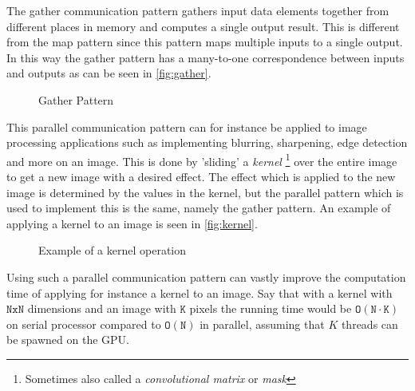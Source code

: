 The gather communication pattern gathers input data elements together from different places in memory and computes a single output result.
This is different from the map pattern since this pattern maps multiple inputs to a single output.
In this way the gather pattern has a many-to-one correspondence between inputs and outputs as can be seen in \autoref{fig:gather}.

\begin{figure}[ht]
	\centering
	\caption{Gather Pattern}
	\label{fig:gather}
\end{figure}

This parallel communication pattern can for instance be applied to image processing applications such as implementing blurring, sharpening, edge detection and more on an image.
This is done by 'sliding' a \textit{kernel} \footnote{Sometimes also called a \textit{convolutional matrix} or \textit{mask}} over the entire image to get a new image with a desired effect.
The effect which is applied to the new image is determined by the values in the kernel, but the parallel pattern which is used to implement this is the same, namely the gather pattern.
An example of applying a kernel to an image is seen in \autoref{fig:kernel}.
\begin{figure}[ht]
	\centering
	\caption{Example of a kernel operation}
	\label{fig:kernel}
\end{figure}
Using such a parallel communication pattern can vastly improve the computation time of applying for instance a kernel to an image.
Say that with a kernel with $\mathtt{NxN}$ dimensions and an image with $\mathtt{K}$ pixels the running time would be $\mathtt{O(N\cdot K)}$ on serial processor compared to $\mathtt{O(N)}$ in parallel, assuming that $K$ threads can be spawned on the GPU.

